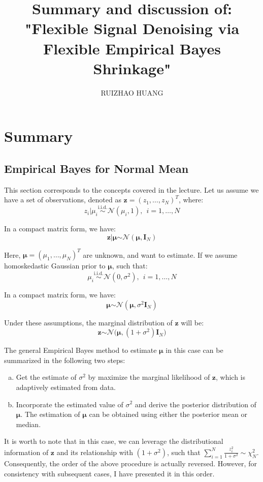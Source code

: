 \documentclass[11pt]{article}
\title{Summary and discussion of: "Flexible Signal Denoising via Flexible Empirical Bayes Shrinkage" }
\author{RUIZHAO HUANG}
\date{}
\begin{document}
\maketitle

\section{Summary}
	
\subsection{Empirical Bayes for Normal Mean}
This section corresponds to the concepts covered in the lecture. Let us assume we have a set of observations, denoted as $\boldsymbol{z} = (z_1, \ldots, z_N)^T$, where:
$$
z_i \vert \mu_i \stackrel{\text{i.i.d.}}{\sim} \mathcal{N}(\mu_i, 1), \ \  i = 1, \ldots, N 
$$

In a compact matrix form, we have:
$$
\boldsymbol{z} \vert \boldsymbol{\mu} \stackrel{\text{}}{\sim} \mathcal{N}(\boldsymbol{\mu}, \mathbf{I}_N)
$$


Here, $\boldsymbol{\mu} = (\mu_1, \ldots, \mu_N)^T$ are unknown, and want to estimate. If we assume homoskedastic Gaussian prior to $\boldsymbol{\mu}$, such that:
$$
\mu_i \stackrel{\text{i.i.d.}}{\sim} \mathcal{N}(0, \sigma^2), \ \ i = 1, \ldots, N 
$$

In a compact matrix form, we have:
$$
\boldsymbol{\mu} \stackrel{\text{}}{\sim} \mathcal{N}(\boldsymbol{\mu}, \sigma^2 \mathbf{I}_N)
$$


Under these assumptions, the marginal distribution of $\boldsymbol{z}$ will be:
$$
\boldsymbol{z}  \stackrel{\text{}}{\sim} \mathcal{N} \bigl(\boldsymbol{\mu}, (1 + \sigma^2) \mathbf{I}_N \bigl) 
$$

The general Empirical Bayes method to estimate $\boldsymbol{\mu}$ in this case can be summarized in the following two steps:
\begin{enumerate}[a)]
\item Get the estimate of $\sigma^2$ by maximize the marginal likelihood of $\boldsymbol{z}$, which is adaptively estimated from data.
\item Incorporate the estimated value of $\sigma^2$ and derive the posterior distribution of $\boldsymbol{\mu}$. The estimation of $\boldsymbol{\mu}$ can be obtained using either the posterior mean or median.
\end{enumerate}

It is worth to note that in this case, we can leverage the distributional information of $\boldsymbol{z}$ and its relationship with $(1 + \sigma^2)$, such that $\sum_{i=1}^N \frac{z_i^2}{1+\sigma^2} \sim \chi_N^2$. Consequently, the order of the above procedure is actually reversed. However, for consistency with subsequent cases, I have presented it in this order.
\end{document}
